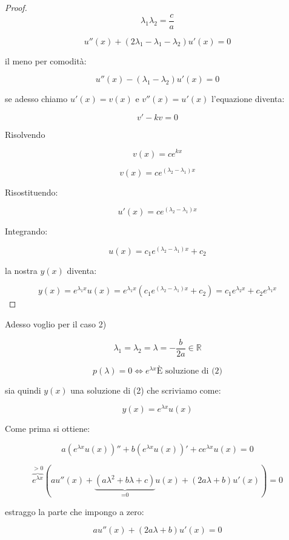 \documentclass[11pt]{article}
\begin{document}
\begin{proof}
        \[
            \lambda_1  \lambda_2 = \frac{c}{a}
        \]

        \[
            u''(x) + (2 \lambda_1 - \lambda_1 - \lambda_2)u'(x) = 0
        \]

        il meno per comodità:

        \[
            u''(x) - (\lambda_1 - \lambda_2)u'(x) = 0
        \]

        se adesso chiamo $u'(x)=v(x)$ e $v''(x) = u'(x)$ l'equazione diventa:

        \[
            v' -kv = 0
        \]

        Risolvendo 

        \[
            v(x) = ce ^{kx}
        \]

        \[
            v(x) = c e^{(\lambda_2 - \lambda_1)x}
        \]

        Risostituendo:

        \[
            u'(x) = c e ^{(\lambda_2- \lambda_1)x}
        \]

        Integrando:

        \[
            u(x)  = c_1 e ^{(\lambda_2 - \lambda_1)x}+c_2
        \]
        
        la nostra $y(x)$ diventa:

        \[
            y(x) = e ^{\lambda_1 x}u(x) = e ^{\lambda_1 x}( c_1 e ^{(\lambda_2 - \lambda_1)x}+c_2) = c_1 e ^{\lambda_2 x}+ c_2 e ^{\lambda_1 x}
        \]


\end{proof}

Adesso voglio per il caso 2)

\[
    \lambda_1 = \lambda_2 = \lambda = -\frac{b}{2a} \in \mathbb{R}
\]
   
\[
    p(\lambda) =0 \Leftrightarrow e ^{\lambda x} \text{È soluzione di (2)}
\]

sia quindi $y(x)$ una soluzione di (2) che scriviamo come:

\[
    y(x) = e ^{\lambda x}u(x) 
\]

Come prima si ottiene:

\[
    a(e ^{\lambda x}u(x) )''+ b(e ^{\lambda x}u(x))' + c e ^{\lambda x}u(x)=0
\]

\[
    \overbrace{e ^{\lambda x}}^{>0}(a u''(x) + \underbrace{(a \lambda^{2}+b \lambda +c )}_\text{=0} u(x) + (2a \lambda+b)u'(x))=0
\]

estraggo la parte che impongo a zero:

\[
    au''(x) + (2a \lambda+b)u'(x) = 0
\]
\end{document}
